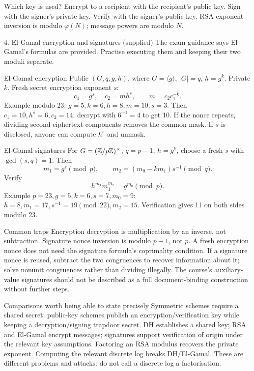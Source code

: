 \documentclass[11pt,a4paper]{article}
\begin{document}
\begin{tip}{Which key is used?}
Encrypt to a recipient with the recipient's public key. Sign with the signer's private key. Verify with the signer's public key. RSA exponent inversion is modulo \(\varphi(N)\); message powers are modulo \(N\).
\end{tip}
\clearpage
\begin{concept}{4. El-Gamal encryption and signatures (supplied)}
The exam guidance says El-Gamal's formulas are provided. Practise executing them and keeping their two moduli separate.
\end{concept}
\begin{method}{El-Gamal encryption}
Public \((G,q,g,h)\), where \(G=\langle g\rangle\), \(|G|=q\), \(h=g^k\). Private \(k\). Fresh secret encryption exponent \(s\):
\[c_1=g^s,\quad c_2=mh^s,\qquad m=c_2c_1^{-k}.\]
Example modulo 23: \(g=5,k=6,h=8,m=10,s=3\). Then \(c_1=10,h^s=6,c_2=14\); decrypt with \(6^{-1}=4\) to get 10. If the nonce repeats, dividing second ciphertext components removes the common mask. If \(s\) is disclosed, anyone can compute \(h^s\) and unmask.
\end{method}
\begin{method}{El-Gamal signatures}
For \(G=(\mathbb Z/p\mathbb Z)^\times\), \(q=p-1\), \(h=g^k\), choose a fresh \(s\) with \(\gcd(s,q)=1\). Then
\[m_1=g^s\pmod p,\qquad m_2=(m_0-km_1)s^{-1}\pmod q.\]
Verify
\[h^{m_1}m_1^{m_2}=g^{m_0}\pmod p.\]
Example \(p=23,g=5,k=6,s=7,m_0=9\): \(h=8,m_1=17,s^{-1}=19\pmod{22},m_2=15\). Verification gives 11 on both sides modulo 23.
\end{method}
\begin{tip}{Common traps}
Encryption decryption is multiplication by an inverse, not subtraction. Signature nonce inversion is modulo \(p-1\), not \(p\). A fresh encryption nonce does not need the signature formula's coprimality condition. If a signature nonce is reused, subtract the two congruences to recover information about it; solve nonunit congruences rather than dividing illegally. The course's auxiliary-value signatures should not be described as a full document-binding construction without further steps.
\end{tip}
\begin{concept}{Comparisons worth being able to state precisely}
Symmetric schemes require a shared secret; public-key schemes publish an encryption/verification key while keeping a decryption/signing trapdoor secret. DH establishes a shared key; RSA and El-Gamal encrypt messages; signatures support verification of origin under the relevant key assumptions. Factoring an RSA modulus recovers the private exponent. Computing the relevant discrete log breaks DH/El-Gamal. These are different problems and attacks: do not call a discrete log a factorisation.
\end{concept}
\end{document}
